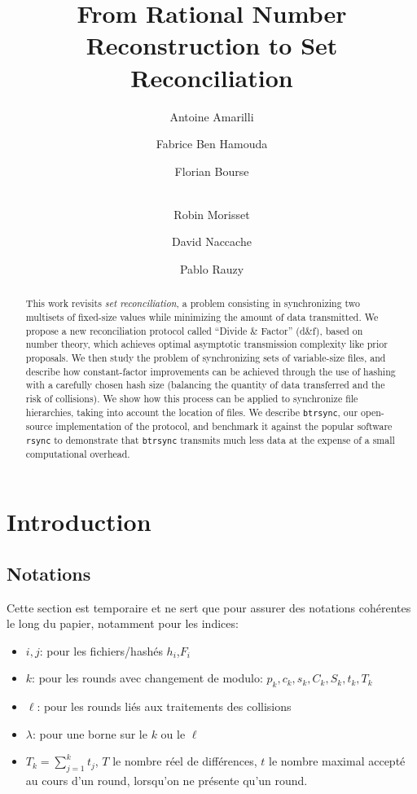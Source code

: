 \documentclass[11pt]{llncs}
\newcommand{\btrsync}{\texttt{btrsync}\xspace}
\newcommand{\rsync}{\texttt{rsync}\xspace}
\newcommand{\comm}[1]{\marginpar{%
\vskip-\baselineskip %
\raggedright\footnotesize
\itshape\hrule\smallskip#1\par\smallskip\hrule}}
\begin{document}
\title{From Rational Number Reconstruction to Set Reconciliation}

\author{Antoine Amarilli \and Fabrice Ben Hamouda \and Florian Bourse \and\\
Robin Morisset \and David Naccache \and Pablo Rauzy}


\maketitle
\comm{Penser à voir si on change le titre.}

\begin{abstract}
  This work revisits {\sl set reconciliation}, a problem consisting in synchronizing two multisets of fixed-size values while minimizing the amount of data transmitted. We propose a new reconciliation protocol called ``Divide \& Factor'' ({\sc d\&f}), based on number theory, which achieves optimal asymptotic transmission complexity like prior proposals. We then study the problem of synchronizing sets of variable-size files, and describe how constant-factor improvements can be achieved through the use of hashing with a carefully chosen hash size (balancing the quantity of data transferred and the risk of collisions). We show how this process can be applied to synchronize file hierarchies, taking into account the location of files. We describe \btrsync, our open-source implementation of the protocol, and benchmark it against the popular software \rsync to demonstrate that \btrsync transmits much less data at the expense of a small computational overhead.
\end{abstract}

\section{Introduction}

\subsection*{Notations}

Cette section est temporaire et ne sert que pour assurer des notations cohérentes le long du papier, notamment pour les indices:
\begin{itemize}
\item $i,j$: pour les fichiers/hashés $h_i$,$F_i$
\item $k$: pour les rounds avec changement de modulo: $p_k,c_k,s_k,C_k,S_k,t_k,T_k$
\item $\ell$: pour les rounds liés aux traitements des collisions
\item $\lambda$: pour une borne sur le $k$ ou le $\ell$
\item $T_k = \sum_{j=1}^k t_j$, $T$ le nombre réel de différences, $t$ le nombre
  maximal accepté au cours d'un round, lorsqu'on ne présente qu'un round.
\end{itemize}
\end{document}
